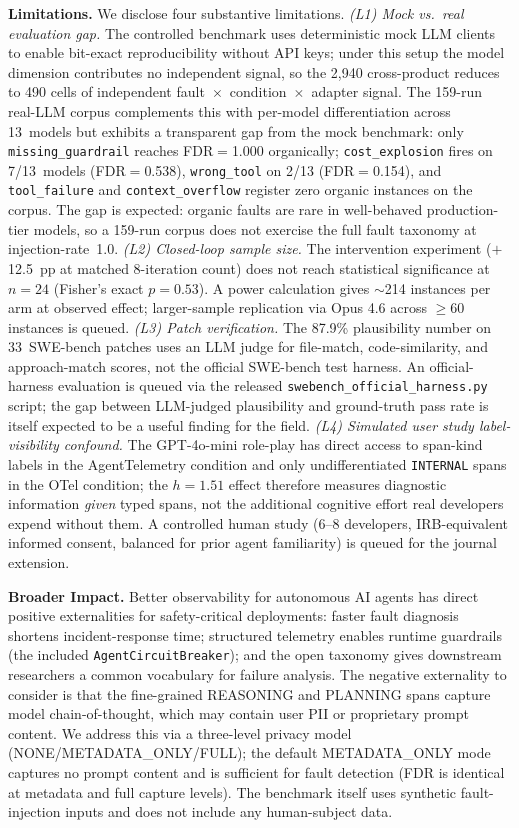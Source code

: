 \documentclass[11pt]{article}
\begin{document}
\textbf{Limitations.}
We disclose four substantive limitations.
\emph{(L1) Mock vs.\ real evaluation gap.} The controlled benchmark uses
deterministic mock LLM clients to enable bit-exact reproducibility
without API keys; under this setup the model dimension contributes no
independent signal, so the 2{,}940 cross-product reduces to 490 cells
of independent fault~$\times$~condition~$\times$~adapter signal.
The 159-run real-LLM corpus complements this with per-model
differentiation across 13~models but exhibits a transparent gap from
the mock benchmark: only \texttt{missing\_guardrail} reaches FDR$=$1.000
organically; \texttt{cost\_explosion} fires on 7/13~models (FDR$=$0.538),
\texttt{wrong\_tool} on 2/13 (FDR$=$0.154), and \texttt{tool\_failure}
and \texttt{context\_overflow} register zero organic instances on the
corpus.  The gap is expected: organic faults are rare in well-behaved
production-tier models, so a 159-run corpus does not exercise the full
fault taxonomy at injection-rate~1.0.
\emph{(L2) Closed-loop sample size.} The intervention experiment
($+$12.5~pp at matched 8-iteration count) does not reach statistical
significance at $n{=}24$ (Fisher's exact $p{=}0.53$).  A power
calculation gives $\sim$214 instances per arm at observed effect;
larger-sample replication via Opus 4.6 across $\geq{}60$ instances is
queued.
\emph{(L3) Patch verification.} The 87.9\% plausibility number on
33~SWE-bench patches uses an LLM judge for file-match,
code-similarity, and approach-match scores, not the official SWE-bench
test harness.  An official-harness evaluation is queued via the
released \texttt{swebench\_official\_harness.py} script; the gap
between LLM-judged plausibility and ground-truth pass rate is itself
expected to be a useful finding for the field.
\emph{(L4) Simulated user study label-visibility confound.} The
GPT-4o-mini role-play has direct access to span-kind labels in the
AgentTelemetry condition and only undifferentiated \texttt{INTERNAL}
spans in the OTel condition; the $h{=}1.51$ effect therefore measures
diagnostic information \emph{given} typed spans, not the additional
cognitive effort real developers expend without them.  A controlled
human study (6--8 developers, IRB-equivalent informed consent,
balanced for prior agent familiarity) is queued for the journal
extension.

\textbf{Broader Impact.}
Better observability for autonomous AI agents has direct positive
externalities for safety-critical deployments: faster fault diagnosis
shortens incident-response time; structured telemetry enables runtime
guardrails (the included \texttt{AgentCircuitBreaker}); and the open
taxonomy gives downstream researchers a common vocabulary for failure
analysis.  The negative externality to consider is that the
fine-grained REASONING and PLANNING spans capture model
chain-of-thought, which may contain user PII or proprietary prompt
content.  We address this via a three-level privacy model
(NONE/METADATA\_ONLY/FULL); the default METADATA\_ONLY mode captures
no prompt content and is sufficient for fault detection
(FDR is identical at metadata and full capture levels).  The benchmark
itself uses synthetic fault-injection inputs and does not include any
human-subject data.
\end{document}
